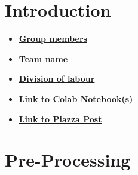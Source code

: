 \newif\ifshowsolutions
\showsolutionstrue

\newcommand{\boldline}[1]{\underline{\textbf{#1}}}




\pagestyle{fancy}






\section{Introduction}
\medskip
\begin{itemize}

    \item \boldline{Group members} \\

    \item \boldline{Team name} \\

    \item \boldline{Division of labour} \\
    
    \item \boldline{Link to Colab Notebook(s)} \\
    
    \item \boldline{Link to Piazza Post} \\

\end{itemize}



\section{Pre-Processing}
\medskip

